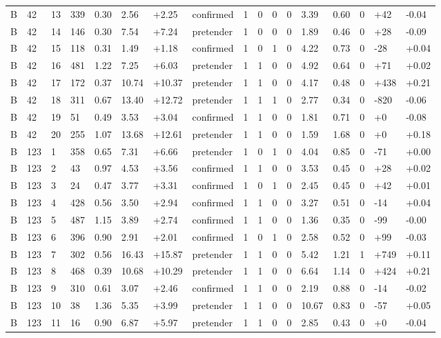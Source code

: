 \documentclass[11pt,a4paper]{article}
\begin{document}
{\begin{longtable}[]{@{}lllllllllllllllll@{}}
B & 42 & 13 & 339 & 0.30 & 2.56 & +2.25 & confirmed & 1 & 0 & 0 & 0 & 3.39 & 0.60 & 0 & +42 & -0.04 \\
B & 42 & 14 & 146 & 0.30 & 7.54 & +7.24 & pretender & 1 & 0 & 0 & 0 & 1.89 & 0.46 & 0 & +28 & -0.09 \\
B & 42 & 15 & 118 & 0.31 & 1.49 & +1.18 & confirmed & 1 & 0 & 1 & 0 & 4.22 & 0.73 & 0 & -28 & +0.04 \\
B & 42 & 16 & 481 & 1.22 & 7.25 & +6.03 & pretender & 1 & 1 & 0 & 0 & 4.92 & 0.64 & 0 & +71 & +0.02 \\
B & 42 & 17 & 172 & 0.37 & 10.74 & +10.37 & pretender & 1 & 1 & 0 & 0 & 4.17 & 0.48 & 0 & +438 & +0.21 \\
B & 42 & 18 & 311 & 0.67 & 13.40 & +12.72 & pretender & 1 & 1 & 1 & 0 & 2.77 & 0.34 & 0 & -820 & -0.06 \\
B & 42 & 19 & 51 & 0.49 & 3.53 & +3.04 & confirmed & 1 & 1 & 0 & 0 & 1.81 & 0.71 & 0 & +0 & -0.08 \\
B & 42 & 20 & 255 & 1.07 & 13.68 & +12.61 & pretender & 1 & 1 & 0 & 0 & 1.59 & 1.68 & 0 & +0 & +0.18 \\
B & 123 & 1 & 358 & 0.65 & 7.31 & +6.66 & pretender & 1 & 0 & 1 & 0 & 4.04 & 0.85 & 0 & -71 & +0.00 \\
B & 123 & 2 & 43 & 0.97 & 4.53 & +3.56 & confirmed & 1 & 1 & 0 & 0 & 3.53 & 0.45 & 0 & +28 & +0.02 \\
B & 123 & 3 & 24 & 0.47 & 3.77 & +3.31 & confirmed & 1 & 0 & 1 & 0 & 2.45 & 0.45 & 0 & +42 & +0.01 \\
B & 123 & 4 & 428 & 0.56 & 3.50 & +2.94 & confirmed & 1 & 1 & 0 & 0 & 3.27 & 0.51 & 0 & -14 & +0.04 \\
B & 123 & 5 & 487 & 1.15 & 3.89 & +2.74 & confirmed & 1 & 1 & 0 & 0 & 1.36 & 0.35 & 0 & -99 & -0.00 \\
B & 123 & 6 & 396 & 0.90 & 2.91 & +2.01 & confirmed & 1 & 0 & 1 & 0 & 2.58 & 0.52 & 0 & +99 & -0.03 \\
B & 123 & 7 & 302 & 0.56 & 16.43 & +15.87 & pretender & 1 & 1 & 0 & 0 & 5.42 & 1.21 & 1 & +749 & +0.11 \\
B & 123 & 8 & 468 & 0.39 & 10.68 & +10.29 & pretender & 1 & 1 & 0 & 0 & 6.64 & 1.14 & 0 & +424 & +0.21 \\
B & 123 & 9 & 310 & 0.61 & 3.07 & +2.46 & confirmed & 1 & 1 & 0 & 0 & 2.19 & 0.88 & 0 & -14 & -0.02 \\
B & 123 & 10 & 38 & 1.36 & 5.35 & +3.99 & pretender & 1 & 1 & 0 & 0 & 10.67 & 0.83 & 0 & -57 & +0.05 \\
B & 123 & 11 & 16 & 0.90 & 6.87 & +5.97 & pretender & 1 & 1 & 0 & 0 & 2.85 & 0.43 & 0 & +0 & -0.04 \\

\end{longtable}}
\end{document}
